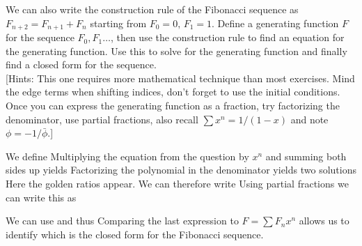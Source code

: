 We can also write the construction rule of the Fibonacci sequence as $F_{n+2} = F_{n+1} + F_{n}$ starting from $F_0=0,\,F_1=1$. 
Define a generating function $F$ for the sequence $F_0,F_1\ldots$, then use the construction rule to find an equation for the generating function. Use this to solve for the generating function and finally find a closed form for the sequence.\\

[Hints: This one requires more mathematical technique than most exercises. Mind the edge terms when shifting indices, don't forget to use the initial conditions. Once you can express the generating function as a fraction, try factorizing the denominator, use partial fractions, also recall $\sum x^n = 1/(1-x)$ and note $\phi=-1/\bar{\phi}$.]

\solution
We define 
Multiplying the equation from the question by $x^n$ and summing both sides up yields
Factorizing the polynomial in the denominator yields two solutions 
Here the golden ratios appear. We can therefore write 
Using partial fractions we can write this as 

We can use 
and thus
Comparing the last expression to $F=\sum F_n x^n$ allows us to identify
which is the closed form for the Fibonacci sequence.


